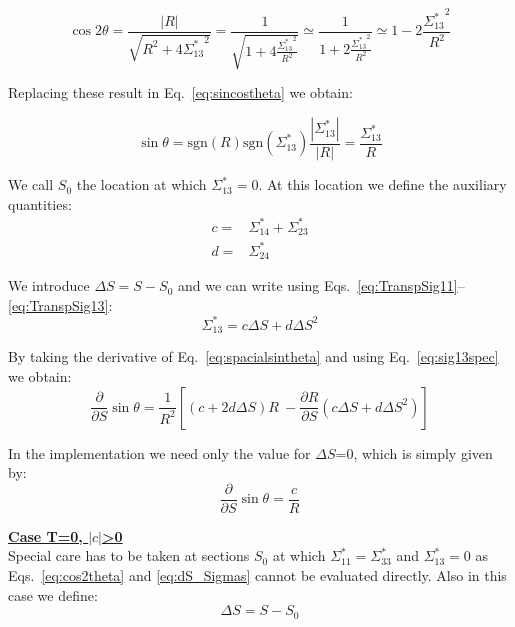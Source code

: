 \begin{equation}
\cos 2 \theta = \frac{\left| R \right|}{\sqrt{R^2+4 {\Sigma^*_{13}}^2}} = \frac{1}{\sqrt{1+4 \frac{{\Sigma^*_{13}}^2}{R^2}}} \simeq \frac{1}{1+2 \frac{{\Sigma^*_{13}}^2}{R^2}} \simeq 1-2 \frac{{\Sigma^*_{13}}^2}{R^2}
\end{equation}

Replacing these result in Eq.~\ref{eq:sincostheta} we obtain:

\begin{equation}
\sin \theta = \mathrm{sgn}(R)\mathrm{sgn}(\Sigma^*_{13})\frac{\left| \Sigma^*_{13} \right|}{\left| R \right|} = \frac{\Sigma^*_{13} }{ R } \label{eq:spacialsintheta}
\end{equation}





We call $S_0$ the location at which ${\Sigma}^*_{13}=0$. At this location we define the auxiliary quantities:
\begin{align}
c =& \Sigma^*_{14} + \Sigma^*_{23}\\
d =& \Sigma^*_{24}
\end{align}

We introduce $\Delta S = S - S_0$ and we can write using Eqs.~\ref{eq:TranspSig11}--\ref{eq:TranspSig13}:
\begin{equation}
\Sigma^*_{13} = c \Delta S +d \Delta S^2 \label{eq:sig13spec}
\end{equation}

By taking the derivative of Eq.~\ref{eq:spacialsintheta} and using Eq.~\ref{eq:sig13spec} we obtain:
\begin{equation}
\frac{\partial }{\partial S} \sin \theta =\frac{1}{R^2}\left[\left(c + 2d \Delta S \right) R \ - \frac{\partial R }{\partial S}\left(c\Delta S + d \Delta S^2 \right)\right]
\end{equation}

In the implementation we need only the value for $\Delta S$=0, which is simply given by:
\begin{equation}
\frac{\partial }{\partial S} \sin \theta =\frac{c}{R}
\end{equation}
 
 
 
\textbf{\underline{Case T=0, $\left| c \right|$>0}}
~\\

Special care has to be taken at sections $S_0$ at which ${\Sigma}^*_{11}={\Sigma}^*_{33}$ and ${\Sigma}^*_{13}=0$ as Eqs.~\ref{eq:cos2theta}  and \ref{eq:dS_Sigmas} cannot be evaluated directly. Also in this case we define:
\begin{equation}
\Delta S = S - S_0
\end{equation}

